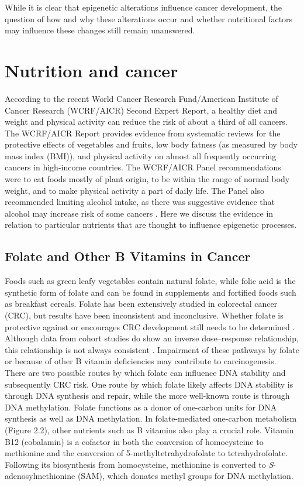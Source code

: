 \noindent While it is clear that epigenetic alterations influence cancer development, the question of how and why these alterations occur and whether nutritional factors may influence these changes still remain unanswered.
\section[]{Nutrition and cancer} %
\noindent According to the recent World Cancer Research Fund/American Institute of Cancer Research (WCRF/AICR) Second Expert Report, a healthy diet and weight and physical activity can reduce the risk of about a third of all cancers. The WCRF/AICR Report provides evidence from systematic reviews for the protective effects of vegetables and fruits, low body fatness (as measured by body mass index (BMI)), and physical activity on almost all frequently occurring cancers in high-income countries. The WCRF/AICR Panel recommendations were to eat foods mostly of plant origin, to be within the range of normal body weight, and to make physical activity a part of daily life. The Panel also recommended limiting alcohol intake, as there was suggestive evidence that alcohol may increase risk of some cancers \cite{c214}. Here we discuss the evidence in relation to particular nutrients that are thought to influence epigenetic processes.

\subsection{Folate and Other B Vitamins in Cancer} %
\noindent Foods such as green leafy vegetables contain natural folate, while folic acid is the synthetic form of folate and can be found in supplements and fortified foods such as breakfast cereals. Folate has been extensively studied in colorectal cancer (CRC), but results have been inconsistent and inconclusive. Whether folate is protective against or encourages CRC development still needs to be determined \cite{c227}. Although data from cohort studies do show an inverse dose--response relationship, this relationship is not always consistent \cite{c214}. Impairment of these pathways by folate or because of other B vitamin deficiencies may contribute to carcinogenesis. There are two possible routes by which folate can influence DNA stability and subsequently CRC risk. One route by which folate likely affects DNA stability is through DNA synthesis and repair, while the more well-known route is through DNA methylation. Folate functions as a donor of one-carbon units for DNA synthesis as well as DNA methylation. In folate-mediated one-carbon metabolism (Figure 2.2), other nutrients such as B vitamins also play a crucial role. Vitamin B12 (cobalamin) is a cofactor in both the conversion of homocysteine to methionine and the conversion of 5-methyltetrahydrofolate to tetrahydrofolate. Following its biosynthesis from homocysteine, methionine is converted to \emph{S}-adenosylmethionine (SAM), which donates methyl groups for DNA methylation.

